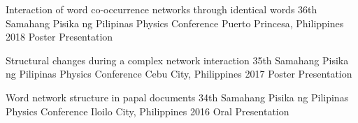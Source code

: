 

\begin{cvpublications}

    \cvpublication
        {Interaction of word co-occurrence networks through identical
words}
        {36th Samahang Pisika ng Pilipinas Physics Conference}
        {Puerto Princesa, Philippines}
        {2018}
        {Poster Presentation}

    \cvpublication
        {Structural changes during a complex network interaction}
        {35th Samahang Pisika ng Pilipinas Physics Conference}
        {Cebu City, Philippines}
        {2017}
        {Poster Presentation}
        
    \cvpublication
        {Word network structure in papal documents}
        {34th Samahang Pisika ng Pilipinas Physics Conference}
        {Iloilo City, Philippines}
        {2016}
        {Oral Presentation}

\end{cvpublications}



